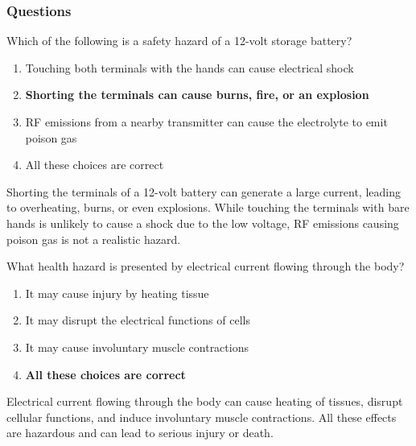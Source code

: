 \subsubsection{Questions}
\begin{tcolorbox}[colback=gray!10!white,colframe=black!75!black,title={T0A01}]
    Which of the following is a safety hazard of a 12-volt storage battery?
    \begin{enumerate}[label=\Alph*),noitemsep]
        \item Touching both terminals with the hands can cause electrical shock
        \item \textbf{Shorting the terminals can cause burns, fire, or an explosion}
        \item RF emissions from a nearby transmitter can cause the electrolyte to emit poison gas
        \item All these choices are correct
    \end{enumerate}
\end{tcolorbox}
Shorting the terminals of a 12-volt battery can generate a large current, leading to overheating, burns, or even explosions. While touching the terminals with bare hands is unlikely to cause a shock due to the low voltage, RF emissions causing poison gas is not a realistic hazard.

\begin{tcolorbox}[colback=gray!10!white,colframe=black!75!black,title={T0A02}]
    What health hazard is presented by electrical current flowing through the body?
    \begin{enumerate}[label=\Alph*),noitemsep]
        \item It may cause injury by heating tissue
        \item It may disrupt the electrical functions of cells
        \item It may cause involuntary muscle contractions
        \item \textbf{All these choices are correct}
    \end{enumerate}
\end{tcolorbox}
Electrical current flowing through the body can cause heating of tissues, disrupt cellular functions, and induce involuntary muscle contractions. All these effects are hazardous and can lead to serious injury or death.


